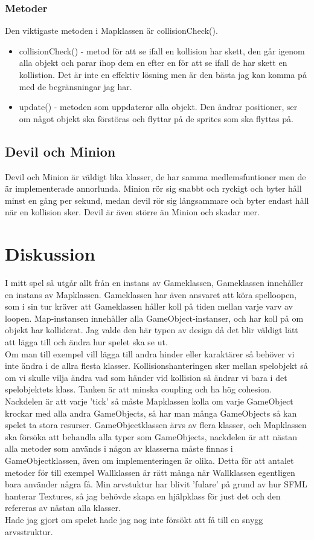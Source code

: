 \documentclass{TDP005mall}
\begin{document}
\subsubsection{Metoder}
Den viktigaste metoden i Mapklassen är collisionCheck().
\begin{itemize}
  \item collisionCheck() - metod för att se ifall en kollision har skett, den går igenom alla objekt och parar ihop dem en efter en 
  för att se ifall de har skett en kollistion. Det är inte en effektiv lösning men är den bästa jag kan komma på med de begränsningar jag har.
  \item update() - metoden som uppdaterar alla objekt. Den ändrar positioner, ser om något objekt ska förstöras och flyttar på de sprites som ska 
  flyttas på.
\end{itemize}

\subsection{Devil och Minion}
Devil och Minion är väldigt lika klasser, de har samma medlemsfuntioner men de är implementerade annorlunda. Minion rör sig snabbt och ryckigt och byter håll 
minst en gång per sekund, medan devil rör sig långsammare och byter endast håll när en kollision sker. Devil är även större än Minion och skadar mer.

\newpage
\section{Diskussion}
I mitt spel så utgår allt från en instans av Gameklassen, Gameklassen innehåller en instans av Mapklassen. Gameklassen har även ansvaret att köra
spelloopen, som i sin tur kräver att Gameklassen håller koll på tiden mellan varje varv av loopen. 
Map-instansen innehåller alla GameObject-instanser, och har koll på om objekt har kolliderat.
Jag valde den här typen av design då det blir väldigt lätt att lägga till och ändra hur spelet ska se ut. \\
Om man till exempel vill lägga till andra hinder eller karaktärer så behöver vi inte ändra i de allra flesta klasser.
Kollisionshanteringen sker mellan spelobjekt så om vi skulle vilja ändra vad som händer vid kollision så ändrar vi bara i det spelobjektets klass.
Tanken är att minska coupling och ha hög cohesion.
Nackdelen är att varje 'tick' så måste Mapklassen kolla om varje GameObject krockar med alla andra GameObjects, 
så har man många GameObjects så kan spelet ta stora resurser. 
GameObjectklassen ärvs av flera klasser, och Mapklassen ska försöka att behandla alla typer som GameObjects, nackdelen är att nästan alla metoder 
som används i någon av klasserna måste finnas i GameObjectklassen, även om implementeringen är olika. Detta för att antalet metoder för till exempel 
Wallklassen är rätt många när Wallklassen egentligen bara använder några få.
Min arvstuktur har blivit 'fulare' på grund av hur SFML hanterar Textures, så jag behövde skapa en hjälpklass för just det och den refereras av 
nästan alla klasser. \\
Hade jag gjort om spelet hade jag nog inte försökt att få till en snygg arvsstruktur.
\end{document}

